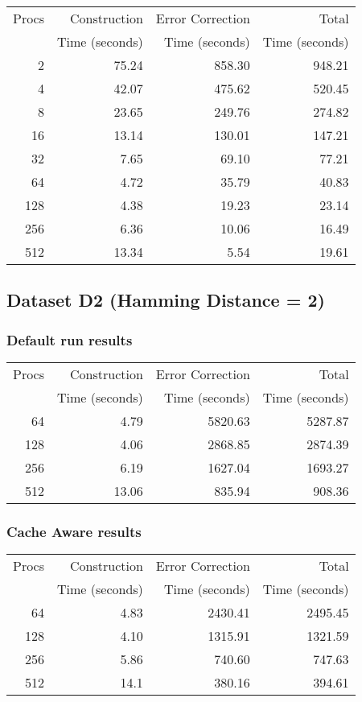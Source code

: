\documentclass[integrals, nointegrals, article, 12pt, a4paper]{article}
\begin{document}
\begin{center}
\begin{tabular}{rrrr}
\hline
Procs & Construction & Error Correction & Total\\
 & Time (seconds) & Time (seconds) & Time (seconds)\\
\hline
2 & 75.24 & 858.30 & 948.21\\
4 & 42.07 & 475.62 & 520.45\\
8 & 23.65 & 249.76 & 274.82\\
16 & 13.14 & 130.01 & 147.21\\
32 & 7.65 & 69.10 & 77.21\\
64 & 4.72 & 35.79 & 40.83\\
128 & 4.38 & 19.23 & 23.14\\
256 & 6.36 & 10.06 & 16.49\\
512 & 13.34 & 5.54 & 19.61\\
\hline
\end{tabular}
\end{center}
\subsection{Dataset D2 (Hamming Distance = 2)}
\label{sec-2-3}
\subsubsection{Default run results}
\label{sec-2-3-1}

\begin{center}
\begin{tabular}{rrrr}
\hline
Procs & Construction & Error Correction & Total\\
 & Time (seconds) & Time (seconds) & Time (seconds)\\
\hline
64 & 4.79 & 5820.63 & 5287.87\\
128 & 4.06 & 2868.85 & 2874.39\\
256 & 6.19 & 1627.04 & 1693.27\\
512 & 13.06 & 835.94 & 908.36\\
\hline
\end{tabular}
\end{center}
\subsubsection{Cache Aware results}
\label{sec-2-3-2}

\begin{center}
\begin{tabular}{rrrr}
\hline
Procs & Construction & Error Correction & Total\\
 & Time (seconds) & Time (seconds) & Time (seconds)\\
\hline
64 & 4.83 & 2430.41 & 2495.45\\
128 & 4.10 & 1315.91 & 1321.59\\
256 & 5.86 & 740.60 & 747.63\\
512 & 14.1 & 380.16 & 394.61\\
\hline
\end{tabular}
\end{center}
\end{document}
